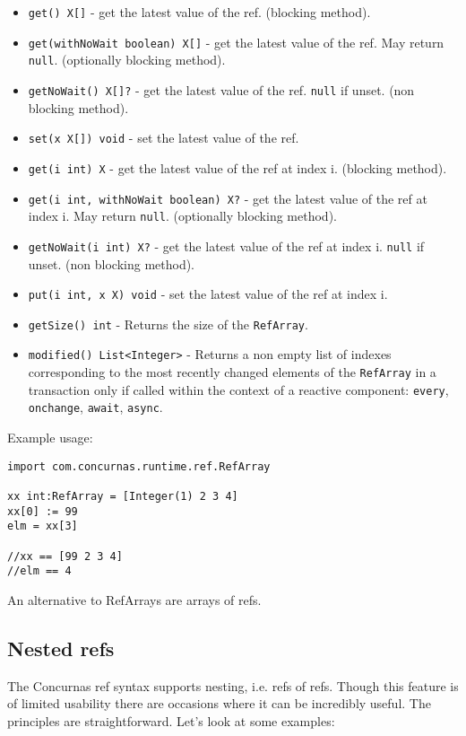 \documentclass[conc-doc]{subfiles}
\begin{document}
\begin{itemize}
	\item \lstinline{get() X[]} - get the latest value of the ref. (blocking method).
	\item \lstinline{get(withNoWait boolean) X[]} - get the latest value of the ref. May return \lstinline{null}. (optionally blocking method). 
	\item \lstinline{getNoWait() X[]?} - get the latest value of the ref. \lstinline{null} if unset. (non blocking method).
	\item \lstinline{set(x X[]) void} - set the latest value of the ref.
	\item \lstinline{get(i int) X} - get the latest value of the ref at index i. (blocking method).
	\item \lstinline{get(i int, withNoWait boolean) X?} - get the latest value of the ref at index i. May return \lstinline{null}. (optionally blocking method).
	\item \lstinline{getNoWait(i int) X?} - get the latest value of the ref at index i. \lstinline{null} if unset. (non blocking method).
	\item \lstinline{put(i int, x X) void} - set the latest value of the ref at index i. 
	\item \lstinline{getSize() int} - Returns the size of the \lstinline{RefArray}.
	\item \lstinline{modified() List<Integer>} - Returns a non empty list of indexes corresponding to the most recently changed elements of the \lstinline{RefArray} in a transaction only if called within the context of a reactive component: \lstinline{every}, \lstinline{onchange}, \lstinline{await}, \lstinline{async}.  	
\end{itemize}

Example usage:

\begin{lstlisting}
import com.concurnas.runtime.ref.RefArray 

xx int:RefArray = [Integer(1) 2 3 4]
xx[0] := 99
elm = xx[3]
	
//xx == [99 2 3 4]
//elm == 4
\end{lstlisting}

An alternative to RefArrays are arrays of refs.

\subsection{Nested refs}
\label{subsec:refofref}
The Concurnas ref syntax supports nesting, i.e. refs of refs. Though this feature is of limited usability there are occasions where it can be incredibly useful. The principles are straightforward. Let's look at some examples:
\end{document}

